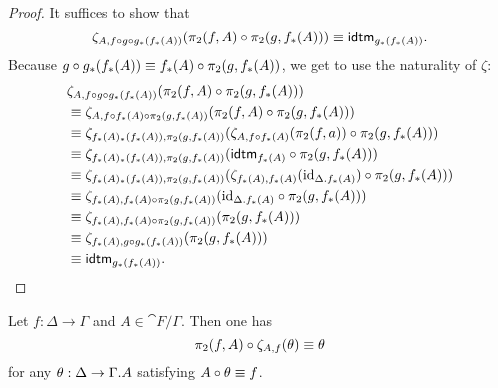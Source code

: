 \begin{proof}
It suffices to show that
\begin{equation*}
\zeta_{A,f\circ g\circ g_\ast(f_\ast(A))}(\pi_2(f,A)\circ\pi_2(g,f_\ast(A)))\jdeq\tfid{g_\ast(f_\ast(A))}.
\end{equation*}
Because $g\circ g_\ast(f_\ast(A))\equiv f_\ast(A)\circ\pi_2(g,f_\ast(A))$, we get
to use the naturality of $\zeta$:
\begin{align*}
& \zeta_{A,f\circ g\circ g_\ast(f_\ast(A))}(\pi_2(f,A)\circ\pi_2(g,f_\ast(A))) \\
& \jdeq
\zeta_{A,f\circ f_\ast(A)\circ\pi_2(g,f_\ast(A))}(\pi_2(f,A)\circ\pi_2(g,f_\ast(A))) \\
& \jdeq
\zeta_{f_\ast(A)_\ast(f_\ast(A)),\pi_2(g,f_\ast(A))}(\zeta_{A,f\circ f_\ast(A)}(\pi_2(f,a))\circ\pi_2(g,f_\ast(A))) \\
& \jdeq
\zeta_{f_\ast(A)_\ast(f_\ast(A)),\pi_2(g,f_\ast(A))}(\tfid{f_\ast(A)}\circ\pi_2(g,f_\ast(A))) \\
& \jdeq
\zeta_{f_\ast(A)_\ast(f_\ast(A)),\pi_2(g,f_\ast(A))}(\zeta_{f_\ast(A),f_\ast(A)}(\catid{\ctxext{\Delta}{f_\ast(A)}})\circ\pi_2(g,f_\ast(A))) \\
& \jdeq
\zeta_{f_\ast(A),f_\ast(A)\circ\pi_2(g,f_\ast(A))}(\catid{\ctxext{\Delta}{f_\ast(A)}}\circ\pi_2(g,f_\ast(A))) \\
& \jdeq
\zeta_{f_\ast(A),f_\ast(A)\circ\pi_2(g,f_\ast(A))}(\pi_2(g,f_\ast(A))) \\
& \jdeq
\zeta_{f_\ast(A),g\circ g_\ast(f_\ast(A))}(\pi_2(g,f_\ast(A)))\\
& \jdeq
\tfid{g_\ast(f_\ast(A))}.\qedhere
\end{align*}
\end{proof}

\begin{lem}
Let $f:\Delta\to\Gamma$ and $A\in\cat{F}/\Gamma$. Then one has 
\begin{equation*}
\pi_2(f,A)\circ\zeta_{A,f}(\theta)\equiv\theta
\end{equation*}
for any $\theta:\Delta\to\ctxext{\Gamma}{A}$ satisfying $A\circ\theta\equiv f$.
\end{lem}

